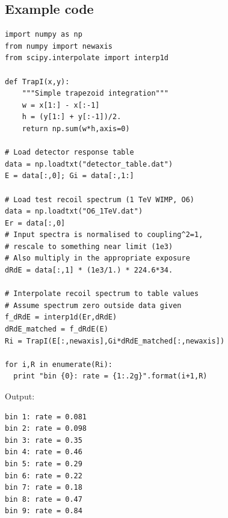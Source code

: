 \subsection{Example code}
\label{app:example_code}
\begin{lstlisting}
import numpy as np
from numpy import newaxis
from scipy.interpolate import interp1d

def TrapI(x,y):
    """Simple trapezoid integration"""
    w = x[1:] - x[:-1]
    h = (y[1:] + y[:-1])/2.
    return np.sum(w*h,axis=0)

# Load detector response table
data = np.loadtxt("detector_table.dat")
E = data[:,0]; Gi = data[:,1:]

# Load test recoil spectrum (1 TeV WIMP, O6)
data = np.loadtxt("O6_1TeV.dat")
Er = data[:,0]
# Input spectra is normalised to coupling^2=1,
# rescale to something near limit (1e3)
# Also multiply in the appropriate exposure
dRdE = data[:,1] * (1e3/1.) * 224.6*34.

# Interpolate recoil spectrum to table values
# Assume spectrum zero outside data given
f_dRdE = interp1d(Er,dRdE)
dRdE_matched = f_dRdE(E)
Ri = TrapI(E[:,newaxis],Gi*dRdE_matched[:,newaxis])

for i,R in enumerate(Ri):
  print "bin {0}: rate = {1:.2g}".format(i+1,R)
\end{lstlisting}

Output:

\begin{lstlisting}
bin 1: rate = 0.081
bin 2: rate = 0.098
bin 3: rate = 0.35
bin 4: rate = 0.46
bin 5: rate = 0.29
bin 6: rate = 0.22
bin 7: rate = 0.18
bin 8: rate = 0.47
bin 9: rate = 0.84
\end{lstlisting}


